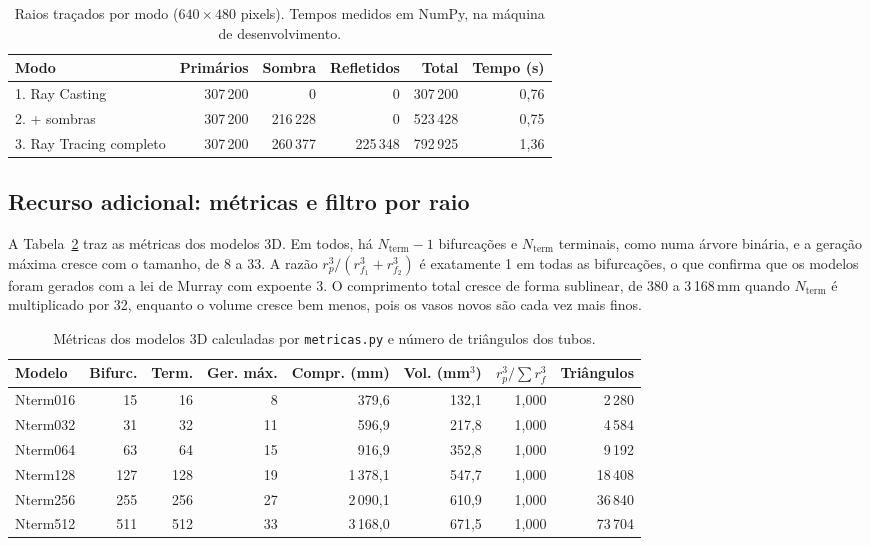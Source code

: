 \documentclass[11pt, a4paper]{article}
\begin{document}
\begin{table}[H]
  \centering
  \small
  \caption{Raios traçados por modo ($640 \times 480$ pixels). Tempos medidos em NumPy, na máquina de desenvolvimento.}
  \label{tab:raios}
  \begin{tabular}{lrrrrr}
    \toprule
    \textbf{Modo} & \textbf{Primários} & \textbf{Sombra} & \textbf{Refletidos} & \textbf{Total} & \textbf{Tempo (s)} \\
    \midrule
    1. Ray Casting          & 307\,200 & 0        & 0        & 307\,200 & 0,76 \\
    2. + sombras            & 307\,200 & 216\,228 & 0        & 523\,428 & 0,75 \\
    3. Ray Tracing completo & 307\,200 & 260\,377 & 225\,348 & 792\,925 & 1,36 \\
    \bottomrule
  \end{tabular}
\end{table}

\subsection{Recurso adicional: métricas e filtro por raio}
A Tabela~\ref{tab:metricas} traz as métricas dos modelos 3D. Em todos, há $N_{\text{term}} - 1$ bifurcações e $N_{\text{term}}$ terminais, como numa árvore binária, e a geração máxima cresce com o tamanho, de 8 a 33. A razão $r_p^3/(r_{f_1}^3 + r_{f_2}^3)$ é exatamente 1 em todas as bifurcações, o que confirma que os modelos foram gerados com a lei de Murray com expoente 3. O comprimento total cresce de forma sublinear, de 380 a 3\,168\,mm quando $N_{\text{term}}$ é multiplicado por 32, enquanto o volume cresce bem menos, pois os vasos novos são cada vez mais finos.

\begin{table}[H]
  \centering
  \small
  \caption{Métricas dos modelos 3D calculadas por \texttt{metricas.py} e número de triângulos dos tubos.}
  \label{tab:metricas}
  \begin{tabular}{lrrrrrrr}
    \toprule
    \textbf{Modelo} & \textbf{Bifurc.} & \textbf{Term.} & \textbf{Ger. máx.} & \textbf{Compr. (mm)} & \textbf{Vol. (mm$^3$)} & $r_p^3/\sum r_f^3$ & \textbf{Triângulos} \\
    \midrule
    Nterm016 & 15  & 16  & 8  & 379,6    & 132,1 & 1,000 & 2\,280 \\
    Nterm032 & 31  & 32  & 11 & 596,9    & 217,8 & 1,000 & 4\,584 \\
    Nterm064 & 63  & 64  & 15 & 916,9    & 352,8 & 1,000 & 9\,192 \\
    Nterm128 & 127 & 128 & 19 & 1\,378,1 & 547,7 & 1,000 & 18\,408 \\
    Nterm256 & 255 & 256 & 27 & 2\,090,1 & 610,9 & 1,000 & 36\,840 \\
    Nterm512 & 511 & 512 & 33 & 3\,168,0 & 671,5 & 1,000 & 73\,704 \\
    \bottomrule
  \end{tabular}
\end{table}
\end{document}
